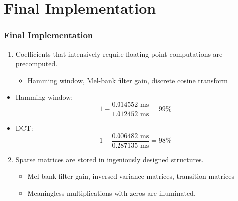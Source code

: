 \section{Final Implementation}


\begin{frame}
\frametitle{Final Implementation}

\begin{enumerate}
	\item Coefficients that intensively require floating-point computations are precomputed.
	\begin{itemize}
		\item Hamming window, Mel-bank filter gain, discrete cosine transform
	\end{itemize}
\end{enumerate}

\begin{itemize}
\item Hamming window:
\begin{equation}
1 - \frac{0.014552 \text{ ms}}{1.012452 \text{ ms}} = 99\%
\end{equation}
\item DCT:
\begin{equation}
1 - \frac{0.006482 \text{ ms}}{0.287135 \text{ ms}} = 98\%
\end{equation}
\end{itemize}
\end{frame}

\begin{frame}
\begin{enumerate}
	\setcounter{enumi}{1}
	\item Sparse matrices are stored in ingeniously designed structures.
	\begin{itemize}
		\item Mel bank filter gain, inversed variance matrices, transition matrices
		\item Meaningless multiplications with zeros are illuminated.
	\end{itemize}
\end{enumerate}
\end{frame}

